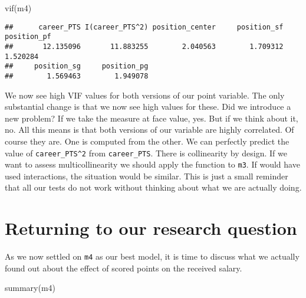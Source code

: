 \documentclass[
]{book}
\newenvironment{Shaded}{\begin{snugshade}}{\end{snugshade}}
\newcommand{\FunctionTok}[1]{\textcolor[rgb]{0.00,0.00,0.00}{#1}}
\newcommand{\NormalTok}[1]{#1}
\begin{document}
\begin{Shaded}
\begin{Highlighting}[]
\FunctionTok{vif}\NormalTok{(m4)}
\end{Highlighting}
\end{Shaded}

\begin{verbatim}
##      career_PTS I(career_PTS^2) position_center     position_sf     position_pf 
##       12.135096       11.883255        2.040563        1.709312        1.520284 
##     position_sg     position_pg 
##        1.569463        1.949078
\end{verbatim}

We now see high VIF values for both versions of our point variable. The only
substantial change is that we now see high values for these. Did we introduce a
new problem? If we take the measure at face value, yes. But if we think about
it, no. All this means is that both versions of our variable are highly
correlated. Of course they are. One is computed from the other. We can
perfectly predict the value of \texttt{career\_PTS\^{}2} from \texttt{career\_PTS}. There is
collinearity by design. If we want to assess multicollinearity we should apply
the function to \texttt{m3}. If would have used interactions, the situation would be
similar. This is just a small reminder that all our tests do not work without
thinking about what we are actually doing.

\hypertarget{returning-to-our-research-question-2}{%
\section{Returning to our research question}\label{returning-to-our-research-question-2}}

As we now settled on \texttt{m4} as our best model, it is time to discuss what we
actually found out about the effect of scored points on the received salary.

\begin{Shaded}
\begin{Highlighting}[]
\FunctionTok{summary}\NormalTok{(m4)}
\end{Highlighting}
\end{Shaded}
\end{document}
